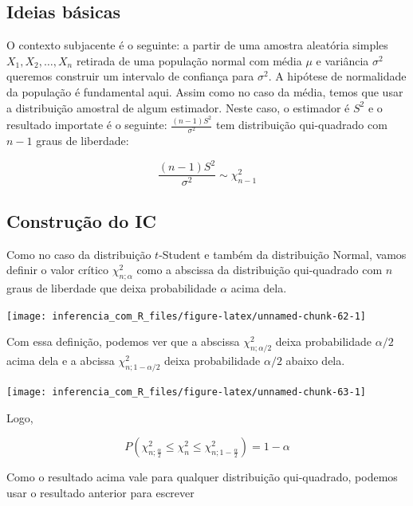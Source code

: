 \documentclass[
]{book}
\begin{document}
\hypertarget{ideias-buxe1sicas-3}{%
\subsection{Ideias básicas}\label{ideias-buxe1sicas-3}}

O contexto subjacente é o seguinte: a partir de uma amostra aleatória simples \(X_1,X_2,\ldots,X_n\) retirada de uma população normal com média \(\mu\) e variância \(\sigma^2\) queremos construir um intervalo de confiança para \(\sigma^2\). A hipótese de normalidade da população é fundamental aqui. Assim como no caso da média, temos que usar a distribuição amostral de algum estimador. Neste caso, o estimador é \(S^2\) e o resultado importate é o seguinte: \(\frac{(n-1)S^2}{\sigma^2}\) tem distribuição qui-quadrado com \(n-1\) graus de liberdade:

\[\frac{(n-1)S^2}{\sigma^2}\sim\chi^2_{n-1}\]

\hypertarget{construuxe7uxe3o-do-ic-1}{%
\subsection{Construção do IC}\label{construuxe7uxe3o-do-ic-1}}

Como no caso da distribuição \(t\)-Student e também da distribuição Normal, vamos definir o valor crítico \(\chi^2_{n;\alpha}\) como a abscissa da distribuição qui-quadrado com \(n\) graus de liberdade que deixa probabilidade \(\alpha\) acima dela.

\begin{center}\texttt{[image: inferencia\_com\_R\_files/figure-latex/unnamed-chunk-62-1]} \end{center}

Com essa definição, podemos ver que a abscissa \(\chi^2_{n;\alpha/2}\) deixa probabilidade \(\alpha/2\) acima dela e a abcissa \(\chi^2_{n;1-\alpha/2}\) deixa probabilidade \(\alpha/2\) abaixo dela.

\begin{center}\texttt{[image: inferencia\_com\_R\_files/figure-latex/unnamed-chunk-63-1]} \end{center}

Logo,

\[P\left(\chi^2_{n;\frac{\alpha}{2}}\leq \chi^2_{n} \leq \chi^2_{n;1-\frac{\alpha}{2}}\right)=1-\alpha\]

Como o resultado acima vale para qualquer distribuição qui-quadrado, podemos usar o resultado anterior para escrever
\end{document}
